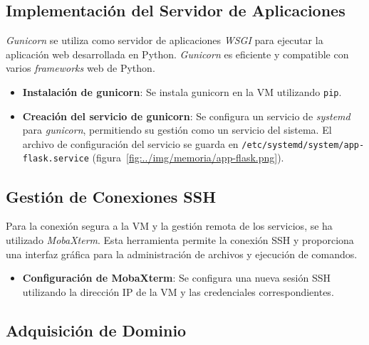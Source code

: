 
\subsection{Implementación del Servidor de Aplicaciones}

\textit{Gunicorn} se utiliza como servidor de aplicaciones \textit{WSGI} para ejecutar la aplicación web desarrollada en Python. \textit{Gunicorn} es eficiente y compatible con varios \textit{frameworks} web de Python.

\begin{itemize}
	\item \textbf{Instalación de gunicorn}: Se instala gunicorn en la VM utilizando \texttt{pip}.
	\item \textbf{Creación del servicio de gunicorn}: Se configura un servicio de \textit{systemd} para \textit{gunicorn}, permitiendo su gestión como un servicio del sistema. El archivo de configuración del servicio se guarda en \texttt{/etc/systemd/system/app-flask.service} (figura~\ref{fig:../img/memoria/app-flask.png}).
\end{itemize}


\subsection{Gestión de Conexiones SSH}

Para la conexión segura a la VM y la gestión remota de los servicios, se ha utilizado \textit{MobaXterm}. Esta herramienta permite la conexión SSH y proporciona una interfaz gráfica para la administración de archivos y ejecución de comandos.

\begin{itemize}
	\item \textbf{Configuración de MobaXterm}: Se configura una nueva sesión SSH utilizando la dirección IP de la VM y las credenciales correspondientes.
\end{itemize}

\subsection{Adquisición de Dominio}

